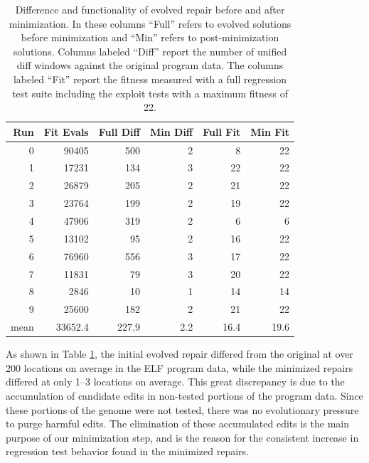 \documentclass{sigcomm-alternate}
\begin{document}
{\begin{table}[htb]
\centering
\begin{tabular}{rrrrrr}
Run  & Fit Evals & Full Diff & Min Diff & Full Fit & Min Fit \\
\toprule
0    & 90405     & 500       & 2        & 8        & 22      \\
1    & 17231     & 134       & 3        & 22       & 22      \\
2    & 26879     & 205       & 2        & 21       & 22      \\
3    & 23764     & 199       & 2        & 19       & 22      \\
4    & 47906     & 319       & 2        & 6        & 6       \\
5    & 13102     & 95        & 2        & 16       & 22      \\
6    & 76960     & 556       & 3        & 17       & 22      \\
7    & 11831     & 79        & 3        & 20       & 22      \\
8    & 2846      & 10        & 1        & 14       & 14      \\
9    & 25600     & 182       & 2        & 21       & 22      \\
\bottomrule
mean & 33652.4   & 227.9     & 2.2      & 16.4     & 19.6    \\
\end{tabular}
\caption{\label{minimized-stats}Difference and functionality of
evolved repair before and after minimization.  In these columns ``Full''
refers to evolved solutions before minimization and ``Min'' refers to
post-minimization solutions.  Columns labeled ``Diff'' report the number
of unified diff windows against the original program data. The columns
labeled ``Fit'' report the fitness measured with a full regression test
suite including the exploit tests with a maximum fitness of 22.}
\end{table}

As shown in Table \ref{minimized-stats}, the initial evolved repair
differed from the original at over 200 locations on average in the ELF
program data, while the minimized repairs differed at only 1--3
locations on average.  This great discrepancy is due to the
accumulation of candidate edits in non-tested portions of the program
data.  Since these portions of the genome were not tested, there was
no evolutionary pressure to purge harmful edits.  The elimination of
these accumulated edits is the main purpose of our minimization step,
and is the reason for the consistent increase in regression test
behavior found in the minimized repairs.

}
\end{document}
